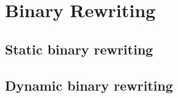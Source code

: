 \chapter{Binary Rewriting}

\section{Static binary rewriting}
\section{Dynamic binary rewriting}



